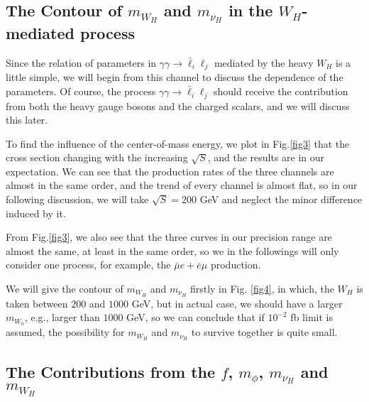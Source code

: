 \documentclass[preprint,aps,12pt,showpacs,nofootinbib,tightenlines]{revtex4}
\begin{document}
\subsection{The Contour of $m_{W_H}$ and $m_{\nu_H}$ in the $W_H$-mediated process}
Since the relation of parameters in $\gamma\gamma \to \bar \ell_i \ell_j$ mediated by the heavy $W_H$ is a little simple, we will begin from
this channel to discuss the dependence of the parameters. Of course, the process $\gamma\gamma \to \bar \ell_i \ell_j$
should receive the contribution from
both the heavy gauge bosons and the charged scalars, and we will discuss this later.


To find the influence of the center-of-mass energy, we plot in Fig.\ref{fig3} that the cross section changing with the increasing
$\sqrt{S}$, and the results are in our expectation. We can see that the production rates of the three channels are almost in the same order,
and the trend of every channel is almost flat, so in our following discussion, we will take  $\sqrt{S}=200$ GeV and
neglect the minor difference induced by it.

From Fig.\ref{fig3}, we also see that the three curves in our precision range are almost the same, at least in the same order, so we
in the followings will only consider one process, for example, the  $\bar \mu e + \bar e \mu$ production.

We will give the contour of $m_{W_H}$ and $m_{\nu_H}$ firstly in Fig. \ref{fig4},
in which, the $W_H$ is taken between $200$ and $1000$ GeV, but in actual case, we should have
a larger $m_{W_h}$, e.g., larger than $1000$ GeV, so we can conclude that if $10^{-2}$ fb limit is assumed,
the possibility for $m_{W_H}$ and $m_{\nu_H}$ to survive together is quite small.









\subsection{The Contributions from the $f$, $m_\phi $, $m_{\nu_H}$ and $m_{W_H}$}
\end{document}

